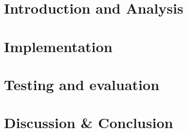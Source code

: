 \documentclass[11pt]{report}
\title{}
\subtitle{}
\begin{document}
    

    \maketitle

    \tableofcontents



    \chapter{Introduction and Analysis}\label{ch:introduction-and-analysis}

    
    
    
    
    

    \chapter{Implementation}\label{ch:implementation}

    
    
    
    

    \chapter{Testing and evaluation}\label{ch:testing-and-evaluation}

    

    \chapter{Discussion \& Conclusion}\label{ch:discussion-conclusion}
    

    \appendix

    \printglossary[type=\acronymtype]

    \printbibliography[heading=bibintoc]
\end{document}
